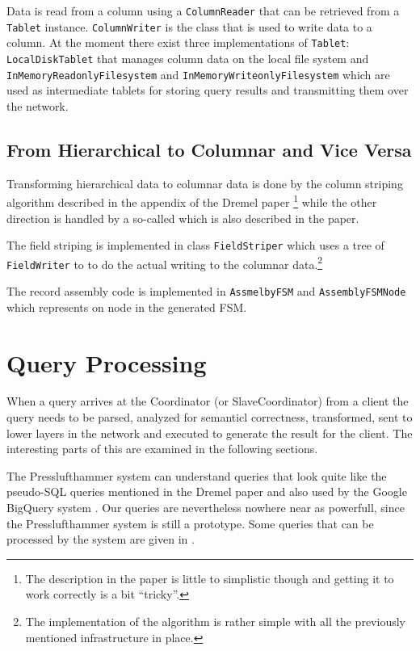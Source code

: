 Data is read from a column using a \texttt{ColumnReader} that can be
retrieved from a \texttt{Tablet} instance. \texttt{ColumnWriter} is the
class that is used to write data to a column. At the moment there exist
three implementations of \texttt{Tablet}: \texttt{LocalDiskTablet} that
manages column data on the local file system and
\texttt{InMemoryReadonlyFilesystem} and \texttt{InMemoryWriteonlyFilesystem}
which are used as intermediate tablets for storing query results and
transmitting them over the network.

\subsection{From Hierarchical to Columnar and Vice Versa}
\label{sec:transform}

Transforming hierarchical data to columnar data is done by the column
striping algorithm described in the appendix of the Dremel paper
\footnote{The description in the paper is little
to simplistic though and getting it to work correctly is a bit ``tricky''.}
\cite{melnik2010dremel}
while the other direction is handled by a so-called  which
is also described in the paper.

The field striping is implemented in class \texttt{FieldStriper} which
uses a tree of \texttt{FieldWriter} to to do the actual writing to
the columnar data.\footnote{The implementation of the algorithm is rather
simple with all the previously mentioned infrastructure in place.}

The record assembly code is implemented in \texttt{AssmelbyFSM} and
\texttt{AssemblyFSMNode} which represents on node in the generated FSM.


\section{Query Processing}

When a query arrives at the Coordinator (or SlaveCoordinator) from a client
the query needs to be parsed, analyzed for semanticl correctness,
transformed, sent to lower layers in the network and executed to generate
the result for the client. The interesting parts of this
are examined in the following sections.

The Presslufthammer system can understand queries that look quite like
the pseudo-SQL queries mentioned in the Dremel paper \cite{melnik2010dremel}
and also used by the Google BigQuery system \cite{bigquery}. Our queries
are nevertheless nowhere near as powerfull, since the Presslufthammer system
is still a prototype. 
Some queries that can be processed by the system
are given in .

